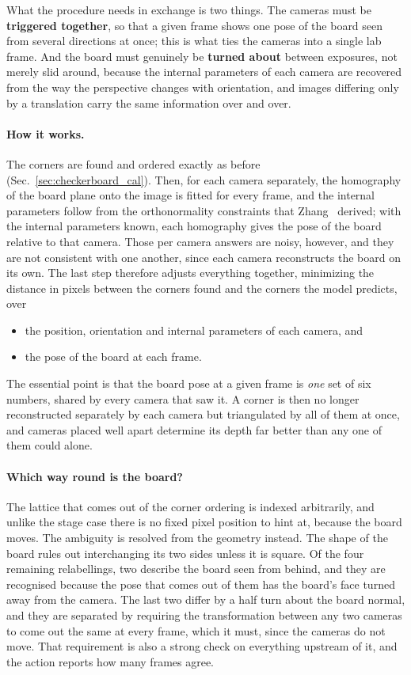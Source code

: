 \documentclass[10pt,a4paper]{article}
\begin{document}
What the procedure needs in exchange is two things. The cameras must be \textbf{triggered together}, so that a given frame shows one pose of the board seen from several directions at once; this is what ties the cameras into a single lab frame. And the board must genuinely be \textbf{turned about} between exposures, not merely slid around, because the internal parameters of each camera are recovered from the way the perspective changes with orientation, and images differing only by a translation carry the same information over and over.

\paragraph{How it works.} The corners are found and ordered exactly as before (Sec.~\ref{sec:checkerboard_cal}). Then, for each camera separately, the homography of the board plane onto the image is fitted for every frame, and the internal parameters follow from the orthonormality constraints that Zhang~\cite{Zhang2000} derived; with the internal parameters known, each homography gives the pose of the board relative to that camera. Those per camera answers are noisy, however, and they are not consistent with one another, since each camera reconstructs the board on its own. The last step therefore adjusts everything together, minimizing the distance in pixels between the corners found and the corners the model predicts, over

\begin{itemize}
	\item the position, orientation and internal parameters of each camera, and
	\item the pose of the board at each frame.
\end{itemize}

The essential point is that the board pose at a given frame is \emph{one} set of six numbers, shared by every camera that saw it. A corner is then no longer reconstructed separately by each camera but triangulated by all of them at once, and cameras placed well apart determine its depth far better than any one of them could alone.

\paragraph{Which way round is the board?} The lattice that comes out of the corner ordering is indexed arbitrarily, and unlike the stage case there is no fixed pixel position to hint at, because the board moves. The ambiguity is resolved from the geometry instead. The shape of the board rules out interchanging its two sides unless it is square. Of the four remaining relabellings, two describe the board seen from behind, and they are recognised because the pose that comes out of them has the board's face turned away from the camera. The last two differ by a half turn about the board normal, and they are separated by requiring the transformation between any two cameras to come out the same at every frame, which it must, since the cameras do not move. That requirement is also a strong check on everything upstream of it, and the action reports how many frames agree.
\end{document}
